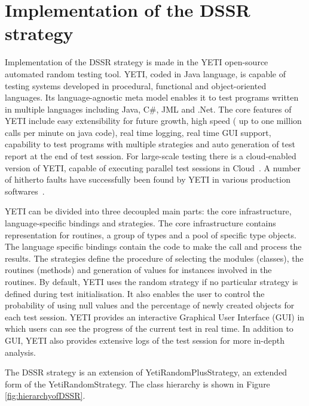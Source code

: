 \documentclass{acm_proc_article-sp}
\begin{document}


\section{Implementation of the DSSR \\ strategy}\label{sec:imp}

Implementation of the DSSR strategy is made in the YETI open-source automated random testing tool. YETI, coded in Java language, is capable of testing systems developed in procedural, functional and object-oriented languages. Its language-agnostic meta model enables it to test programs written in multiple languages including Java, C\#, JML and .Net. The core features of YETI include easy extensibility for future growth, high speed ( up to one million calls per minute on java code), real time logging, real time GUI support, capability to test programs with multiple strategies and auto generation of test report at the end of test session. For large-scale testing there is a cloud-enabled version of YETI, capable of executing parallel test sessions in Cloud~\cite{Oriol2010}. A number of hitherto faults have successfully been found by YETI in various production softwares~\cite{Oriol2011, Oriol2012}.

YETI can be divided into three decoupled main parts: the core infrastructure, language-specific bindings and strategies. The core infrastructure contains representation for routines, a group of types and a pool of specific type objects. The language specific bindings contain the code to make the call and process the results. The strategies define the procedure of selecting the modules (classes), the routines (methods) and generation of values for instances involved in the routines. By default, YETI uses the random strategy if no particular strategy is defined during test initialisation. It also enables the user to control the probability of using null values and the percentage of newly created objects for each test session. YETI provides an interactive Graphical User Interface (GUI) in which users can see the progress of the current test in real time. In addition to GUI, YETI also provides extensive logs of the test session for more in-depth analysis.

The DSSR strategy is an extension of YetiRandomPlusStrategy, an extended form of the YetiRandomStrategy. The class hierarchy is shown in Figure \ref{fig:hierarchyofDSSR}.
\end{document}
